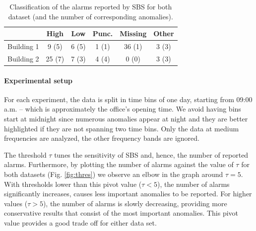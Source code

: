 \begin{table}
\begin{center}
\begin{tabular}{|l||c|c|c|c|c|}
\hline
&High&Low&Punc.&Missing&Other\\ \hline \hline
Building 1& 9 (5) & 6 (5) & 1 (1) & 36 (1) & 3 (3) \\ \hline
Building 2& 25 (7) & 7 (3) & 4 (4) & 0 (0) & 3 (3) \\ \hline
\end{tabular}
\end{center}
\caption{Classification of the alarms reported by SBS for both dataset (and the number of corresponding anomalies).}
\label{tab:classif}
\end{table}

\paragraph{Experimental setup}
For each experiment, the data is split in time bins of one day, starting from 09:00 a.m. -- which is approximately 
the office's opening time.
We avoid having bins start at midnight since numerous anomalies appear at night and they are better highlighted if they are 
not spanning two time bins.
Only the data at medium frequencies are analyzed, the other frequency bands are ignored.


The threshold $\tau$ tunes the sensitivity of SBS and, hence, the number of reported alarms.  
Furthermore, by plotting the number of alarms against the value of $\tau$ for both datasets (Fig. \ref{fig:thres}) we observe an 
elbow in the graph around $\tau=5$.
With thresholds lower than this pivot value ($\tau<5$), the number of alarms significantly increases, causes less important anomalies 
to be reported.  
For higher values ($\tau>5$), the number of alarms is slowly decreasing, providing more conservative results that consist of the 
most important anomalies.
This pivot value provides a good trade off for either data set.


